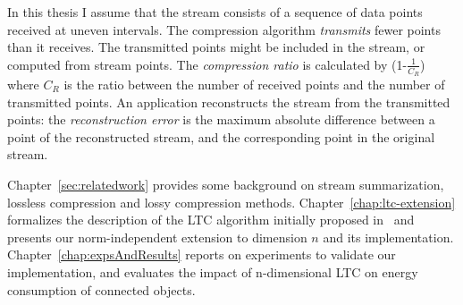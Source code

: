 In this thesis I assume that the stream consists of a sequence of data points
received at uneven intervals. The compression algorithm \emph{transmits} fewer
points than it receives. The transmitted points might be included in the
stream, or computed from stream points. The \emph{compression ratio} is
calculated by (1-$\frac{1}{C_R}$) where $C_R$ is the ratio between the number of
received points and the number of transmitted points. An application
reconstructs the stream from the transmitted points: the \emph{reconstruction
error} is the maximum absolute difference between a point of the reconstructed
stream, and the corresponding point in the original stream. 




Chapter~\ref{sec:relatedwork} provides some background on stream
summarization, lossless compression and lossy compression methods.
Chapter~\ref{chap:ltc-extension} formalizes the description of the LTC
algorithm initially proposed in~\cite{schoellhammer2004lightweight} and
presents our norm-independent extension to dimension $n$ and its
implementation. Chapter~\ref{chap:expsAndResults} reports on experiments to
validate our implementation, and evaluates the impact of n-dimensional LTC
on energy consumption of connected objects.




